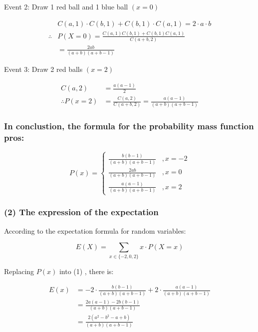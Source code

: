 \documentclass[
]{article}
\begin{document}
Event 2: Draw 1 red ball and 1 blue ball \((x=0)\)

\[
\begin{aligned}
& C(a, 1) \cdot C(b, 1)+C(b, 1) \cdot C(a, 1)=2 \cdot a \cdot b \\
\therefore  & P(X=0)=\frac{C(a, 1) C(b, 1)+C(b, 1) C(a, 1)}{C(a+b, 2)}\\
&=\frac{2 a b}{(a+b)(a+b-1)}
\end{aligned}
\]

Event 3: Draw 2 red balls \((x=2)\)

\[
\begin{aligned}
C(a, 2) & =\frac{a(a-1)}{2} \\
\therefore P(x=2) & =\frac{C(a, 2)}{C(a+b, 2)}=\frac{a(a-1)}{(a+b)(a+b-1)}
\end{aligned}
\]

\subsubsection{In conclustion, the formula for the probability mass
function
pros:}\label{in-conclustion-the-formula-for-the-probability-mass-function-pros}

\[
P(x)= \begin{cases}\frac{b(b-1)}{(a+b)(a+b-1)} & , x=-2 \\ \frac{2a b}{(a+b)(a+b-1)} & , x=0 \\ \frac{a(a-1)}{(a+b)(a+b-1)} & , x=2\end{cases}
\]

\subsubsection{(2) The expression of the
expectation}\label{the-expression-of-the-expectation}

According to the expectation formula for random variables:

\[
\begin{equation}
E(X)=\sum_{x \in\{-2,0,2\}} x \cdot P(X=x) \tag{1}
\end{equation}
\]

Replacing \(P(x)\) into (1) , there is:

\[
\begin{align*}
E(x) & =-2 \cdot \frac{b(b-1)}{(a+b)(a+b-1)}+2 \cdot \frac{a(a-1)}{(a+b)(a+b-1)} \\
& =\frac{2 a(a-1)-2 b(b-1)}{(a+b)(a+b-1)} \\
& =\frac{2\left(a^{2}-b^{2}-a+b\right)}{(a+b)(a+b-1)} \tag{2}
\end{align*}
\]
\end{document}
